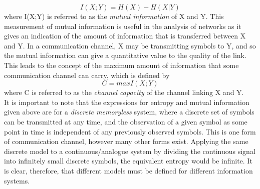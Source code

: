 \documentclass[letterpaper, 10 pt, conference]{ieeeconf}  %
\begin{document}
\begin{equation}
    \label{eq:mutualInf}
    I(X;Y) = H(X) - H(X|Y)
\end{equation}
where I(X;Y) is referred to as the \emph{mutual information} of X and Y. This measurement of mutual information is useful in the analysis of networks as it gives an indication of the amount of information that is transferred between X and Y. In a communication channel, X may be transmitting symbols to Y, and so the mutual information can give a quantitative value to the quality of the link. This leads to the concept of the maximum amount of information that some communication channel can carry, which is defined by
\begin{equation}
    \label{eq:chanCap}
    C = max I(X;Y)
\end{equation}
where C is referred to as the \emph{channel capacity} of the channel linking X and Y.\\
It is important to note that the expressions for entropy and mutual information given above are for a \emph{discrete memoryless} system, where a discrete set of symbols can be transmitted at any time, and the observation of a given symbol as some point in time is independent of any previously observed symbols. This is one form of communication channel, however many other forms exist. Applying the same discrete model to a continuous/analogue system by dividing the continuous signal into infinitely small discrete symbols, the equivalent entropy would be infinite. It is clear, therefore, that different models must be defined for different information systems.
\end{document}
